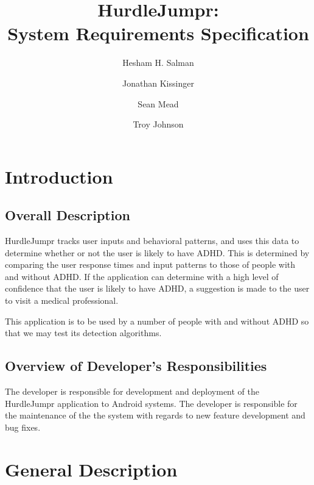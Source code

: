 \documentclass[a4wide]{article}
\title{HurdleJumpr:\\ System Requirements Specification}
\author{Hesham H. Salman \and Jonathan Kissinger \and Sean Mead
\and Troy Johnson}
\begin{document}
\maketitle

\section{Introduction}

\subsection{Overall Description}

HurdleJumpr tracks user inputs and behavioral patterns, and uses this data to
determine whether or not the user is likely to have ADHD. This is determined by
comparing the user response times and input patterns to those of people with and
without ADHD. If the application can determine with a high level of confidence
that the user is likely to have ADHD, a suggestion is made to the user to visit
a medical professional. \par
This application is to be used by a number of people with and without ADHD so
that we may test its detection algorithms.

%
%
%

\subsection{Overview of Developer's Responsibilities}

The developer is responsible for development and deployment of the HurdleJumpr
application to Android systems. The developer is responsible for the maintenance
of the the system with regards to new feature development and bug fixes.


\section{General Description}
\end{document}
